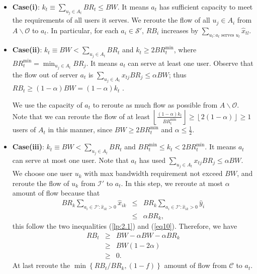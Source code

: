 \documentclass[journal]{IEEEtran}
\begin{document}
\begin{itemize}
	\item \textbf{Case(i)}: $k_t \equiv \sum\nolimits_{{u_j} \in A_t} {{BR_t}} \le BW$. It means $a_t$ has sufficient capacity to meet the requirements of all users it serves. We reroute the flow of all $u_j \in A_i$ from $A\backslash \mathcal{O}$ to $a_t$. In particular, for each $a_i \in \mathcal{S}'$, $RB_i$ increases by $\sum\nolimits_{u_l:a_t \text{ serves } u_l}{\widehat{x}_{tl}}$. \label{alg:CoS:case1}
	
	\item \textbf{Case(ii)}: $k_t \equiv BW < \sum\nolimits_{{u_j} \in A_t} {{BR_t}} $ and $k_t \ge 2BR_t^{\min}$, where $BR_t^{\min} = \min_{u_j \in A_t} BR_j$. It means $a_t$ can serve at least one user. Observe that the flow out of server $a_t$ is $\sum\nolimits_{{u_j} \in A_t}{x_{tj}BR_j} \le \alpha BW$; thus $RB_t \ge (1-\alpha)BW = (1-\alpha)k_t$ \label{alg:CoS:case2}.
	
	We use the capacity of $a_t$ to reroute as much flow as possible from $A \backslash \mathcal{O} $. Note that we can reroute the flow of at least $\left\lfloor {\frac{{(1 - \alpha ){k_t}}}{{BR_t^{\min }}}} \right\rfloor \ge \left\lfloor 2(1-\alpha) \right\rfloor \ge 1$ users of $A_t$ in this manner, since $BW \ge 2BR_t^{\min}$ and $ \alpha \le \frac{1}{2}$.
	
	\item \textbf{Case(iii)}: $k_t \equiv BW < \sum\nolimits_{{u_j} \in A_t} {{BR_t}} $ and $BR_t^{\min} \le k_t < 2BR_t^{\min}$. It means $a_t$ can serve at most one user. Note that $a_t$ has used $ \sum\nolimits_{{u_j} \in A_t}{x_{tj}BR_j} \le \alpha BW$. We choose one user $u_k$ with max bandwidth requirement not exceed $BW$, and reroute the flow of $u_k$ from $\mathcal{I}'$ to $a_t$. In this step, we reroute at most $\alpha$ amount of flow because that
	\begin{eqnarray*}
		BR_k\sum\limits_{a_i\in \mathcal{I}':\widehat{x}_{ik}>0} {\widehat{x}_{ik}} &\le&BR_k\sum\limits_{a_i\in \mathcal{I}':\widehat{x}_{ik}>0} {\widehat{y}_{i}}\\
		&\le&\alpha BR_k,
	\end{eqnarray*}
	this follow the two inequalities (\ref{lp:2.1}) and (\ref{eq10}). Therefore, we have
	\begin{eqnarray*}
		RB_t &\ge& BW-\alpha BW - \alpha BR_k\\
		&\ge&BW(1-2\alpha)\\
		&\ge&0.
	\end{eqnarray*} 
	At last reroute the $\min{\left\{RB_t/BR_k, (1-f)\right\}}$ amount of flow from $\mathcal{C}$ to $a_t$. \label{alg:CoS:case3}
\end{itemize}
\end{document}

